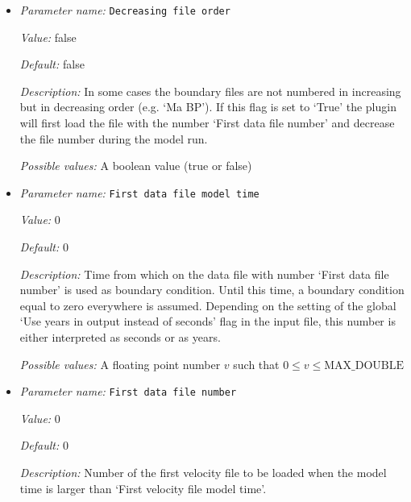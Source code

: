 \begin{itemize}
{\it Possible values:} A floating point number $v$ such that $0 \leq v \leq \text{MAX\_DOUBLE}$
\item {\it Parameter name:} {\tt Decreasing file order}
\label{parameters:Boundary composition model/Ascii data model/Decreasing file order}


{\it Value:} false


{\it Default:} false


{\it Description:} In some cases the boundary files are not numbered in increasing but in decreasing order (e.g. `Ma BP'). If this flag is set to `True' the plugin will first load the file with the number `First data file number' and decrease the file number during the model run.


{\it Possible values:} A boolean value (true or false)
\item {\it Parameter name:} {\tt First data file model time}
\label{parameters:Boundary composition model/Ascii data model/First data file model time}


{\it Value:} 0


{\it Default:} 0


{\it Description:} Time from which on the data file with number `First data file number' is used as boundary condition. Until this time, a boundary condition equal to zero everywhere is assumed. Depending on the setting of the global `Use years in output instead of seconds' flag in the input file, this number is either interpreted as seconds or as years.


{\it Possible values:} A floating point number $v$ such that $0 \leq v \leq \text{MAX\_DOUBLE}$
\item {\it Parameter name:} {\tt First data file number}
\label{parameters:Boundary composition model/Ascii data model/First data file number}


{\it Value:} 0


{\it Default:} 0


{\it Description:} Number of the first velocity file to be loaded when the model time is larger than `First velocity file model time'.



\end{itemize}
